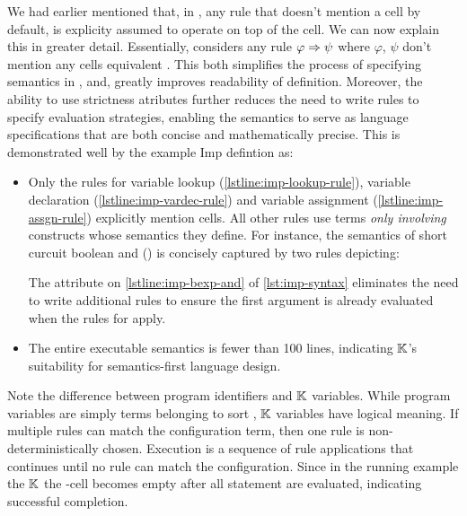 We had earlier mentioned that, in \K{},
any rule that doesn't mention
a cell by default, is explicity assumed to operate on top
of the  cell. We can now explain this in greater
detail. Essentially, \K{} considers any rule $\varphi \Rightarrow \psi$
where $\varphi$, $\psi$ don't mention any cells equivalent
.
This both simplifies the process of specifying semantics in \K{}, and,
greatly improves readability of \K{} definition. Moreover, the
ability to use strictness atributes further reduces the
need to write rules to specify evaluation strategies, enabling
the semantics to serve as language specifications that are both
concise and mathematically precise. This is demonstrated well
by the example Imp defintion as:
\begin{itemize}
  \item Only the rules for variable lookup (\autoref{lstline:imp-lookup-rule}),
    variable declaration (\autoref{lstline:imp-vardec-rule}) and
    variable assignment (\autoref{lstline:imp-assgn-rule}) explicitly
    mention cells. All other rules use terms \emph{only involving} constructs
    whose semantics they define. For instance, the semantics of
    short curcuit boolean and (\inlinek{&&}) is concisely captured
    by two rules depicting:
    The  attribute
    on \autoref{lstline:imp-bexp-and} of \autoref{lst:imp-syntax}
    eliminates the need to write additional rules to ensure the
    first argument is already evaluated when the rules for
    \inlinek{&&} apply.
  \item The entire executable semantics is fewer than 100 lines,
    indicating $\mathbb{K}{}$'s suitability for semantics-first language design.
\end{itemize}

Note the difference between program identifiers and $\mathbb{K}$ variables. While
program variables are simply terms belonging to sort ,
$\mathbb{K}$ variables have logical meaning. If multiple rules can match
the configuration term, then one rule is non-deterministically chosen.
Execution is a sequence of rule applications that continues until no
rule can match the configuration. Since in the running example the
$\mathbb{K}{}$ the -cell becomes empty after all statement are evaluated,
indicating successful completion.

